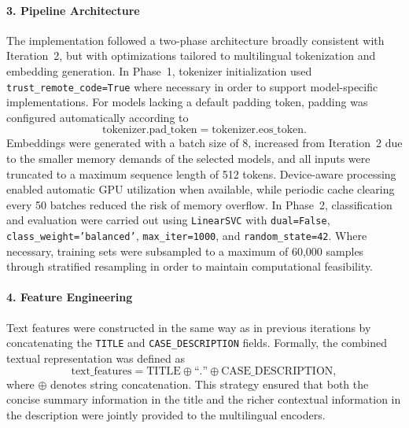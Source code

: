 \documentclass[11pt, titlepage, bibliography=totoc]{scrreprt}
\begin{document}
\paragraph{3. Pipeline Architecture}
The implementation followed a two-phase architecture broadly consistent with Iteration~2, but with optimizations tailored to multilingual tokenization and embedding generation. In Phase~1, tokenizer initialization used \texttt{trust\_remote\_code=True} where necessary in order to support model-specific implementations. For models lacking a default padding token, padding was configured automatically according to
\begin{equation}
\text{tokenizer.pad\_token} = \text{tokenizer.eos\_token}.
\end{equation}
Embeddings were generated with a batch size of 8, increased from Iteration~2 due to the smaller memory demands of the selected models, and all inputs were truncated to a maximum sequence length of 512 tokens. Device-aware processing enabled automatic GPU utilization when available, while periodic cache clearing every 50 batches reduced the risk of memory overflow. In Phase~2, classification and evaluation were carried out using \texttt{LinearSVC} with \texttt{dual=False}, \texttt{class\_weight='balanced'}, \texttt{max\_iter=1000}, and \texttt{random\_state=42}. Where necessary, training sets were subsampled to a maximum of 60,000 samples through stratified resampling in order to maintain computational feasibility.

\paragraph{4. Feature Engineering}
Text features were constructed in the same way as in previous iterations by concatenating the \texttt{TITLE} and \texttt{CASE\_DESCRIPTION} fields. Formally, the combined textual representation was defined as
\begin{equation}
\text{text\_features} = \text{TITLE} \oplus \text{``.''} \oplus \text{CASE\_DESCRIPTION},
\end{equation}
where \(\oplus\) denotes string concatenation. This strategy ensured that both the concise summary information in the title and the richer contextual information in the description were jointly provided to the multilingual encoders.
\end{document}
